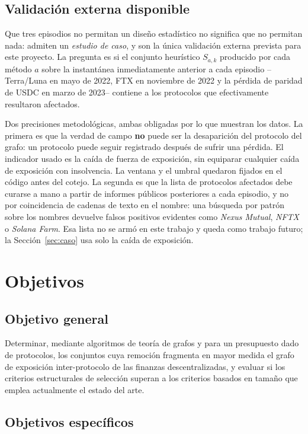 \documentclass[journal]{IEEEtran}
\begin{document}
\subsection{Validación externa disponible}
\label{sec:validacion}

Que tres episodios no permitan un diseño estadístico no significa que no
permitan nada: admiten un \emph{estudio de caso}, y son la única validación
externa prevista para este proyecto. La pregunta es si el conjunto heurístico
$S_{a,k}$ producido por cada método $a$ sobre la instantánea inmediatamente anterior a cada
episodio --Terra/Luna en mayo de 2022, FTX en noviembre de 2022 y la pérdida de
paridad de USDC en marzo de 2023-- contiene a los protocolos que efectivamente
resultaron afectados.

Dos precisiones metodológicas, ambas obligadas por lo que muestran los datos. La
primera es que la verdad de campo \textbf{no} puede ser la desaparición del
protocolo del grafo: un protocolo puede seguir registrado después de sufrir
una pérdida. El indicador usado es la caída de fuerza de exposición, sin
equiparar cualquier caída de exposición con insolvencia. La ventana y el umbral
quedaron fijados en el código antes del cotejo. La
segunda es que la lista de protocolos afectados debe curarse a mano a partir de
informes públicos posteriores a cada episodio, y no por coincidencia de cadenas
de texto en el nombre: una búsqueda por patrón sobre los nombres devuelve falsos
positivos evidentes como \emph{Nexus Mutual}, \emph{NFTX} o \emph{Solana
Farm}. Esa lista no se armó en este trabajo y queda como trabajo futuro; la
Sección~\ref{sec:caso} usa solo la caída de exposición.

\section{Objetivos}

\subsection{Objetivo general}

Determinar, mediante algoritmos de teoría de grafos y para un presupuesto dado
de protocolos, los conjuntos cuya remoción fragmenta en mayor medida el grafo de
exposición inter-protocolo de las finanzas descentralizadas, y evaluar si los
criterios estructurales de selección superan a los criterios basados en tamaño
que emplea actualmente el estado del arte.

\subsection{Objetivos específicos}
\end{document}
